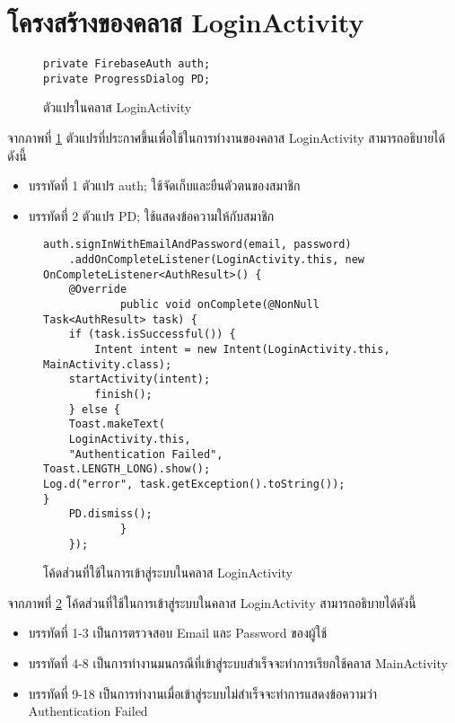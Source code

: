 \section{โครงสร้างของคลาส LoginActivity}
\begin{figure}[H]
	{\begin{lstlisting}
private FirebaseAuth auth;
private ProgressDialog PD;
		\end{lstlisting}}
	\caption{ตัวแปรในคลาส LoginActivity}
	\label{Fig:LoginActivity}
\end{figure}
จากภาพที่ \ref{Fig:LoginActivity} ตัวแปรที่ประกาศขึ้นเพื่อใช้ในการทำงานของคลาส LoginActivity สามารถอธิบายได้ดังนี้
\begin{itemize}[label={--}]
	\item บรรทัดที่ 1 ตัวแปร auth; ใช้จัดเก็บและยืนตัวตนของสมาชิก
	\item บรรทัดที่ 2 ตัวแปร PD;  ใช้แสดงข้อความให้กับสมาชิก 
	
\end{itemize}

\begin{figure}[H]
	{\begin{lstlisting}
auth.signInWithEmailAndPassword(email, password)
	.addOnCompleteListener(LoginActivity.this, new OnCompleteListener<AuthResult>() {
	@Override
			public void onComplete(@NonNull Task<AuthResult> task) {
	if (task.isSuccessful()) {
		Intent intent = new Intent(LoginActivity.this, MainActivity.class);
	startActivity(intent);
		finish();
	} else {
	Toast.makeText(
	LoginActivity.this,
	"Authentication Failed",
Toast.LENGTH_LONG).show();
Log.d("error", task.getException().toString());
}
	PD.dismiss();
			}
	});
\end{lstlisting}}
	\caption{โค้ดส่วนที่ใช้ในการเข้าสู่ระบบในคลาส LoginActivity}
	\label{Fig:LoginActivity2}
\end{figure}
จากภาพที่ \ref{Fig:LoginActivity2} โค้ดส่วนที่ใช้ในการเข้าสู่ระบบในคลาส LoginActivity สามารถอธิบายได้ดังนี้
\begin{itemize}[label={--}]
	\item บรรทัดที่ 1-3 เป็นการตรวจสอบ Email และ Password ของผู้ใช้
	\item บรรทัดที่ 4-8 เป็นการทำงานมนกรณีที่เข้าสู่ระบบสำเร็จจะทำการเรียกใช้คลาส MainActivity
	\item บรรทัดที่ 9-18 เป็นการทำงานเมื่อเข้าสู่ระบบไม่สำเร็จจะทำการแสดงข้อความว่า Authentication Failed
	
\end{itemize}